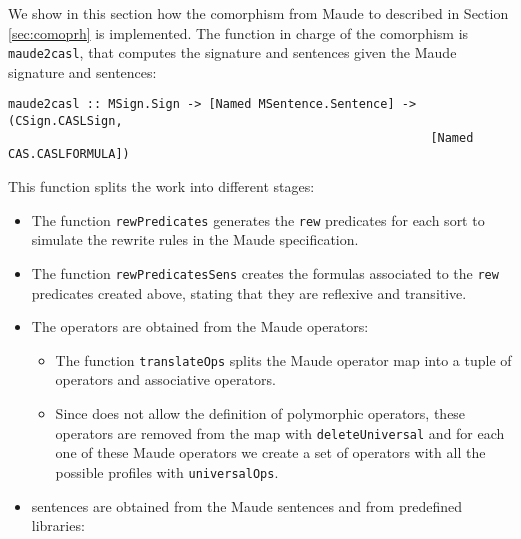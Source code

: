 
We show in this section how the comorphism
from Maude to \CASL described in Section \ref{sec:comoprh} is implemented.
The function in charge of the comorphism is
\verb"maude2casl", that computes the \CASL signature and sentences
given the Maude signature and sentences:

{\codesize
\begin{verbatim}
maude2casl :: MSign.Sign -> [Named MSentence.Sentence] -> (CSign.CASLSign, 
                                                           [Named CAS.CASLFORMULA])
\end{verbatim}
}

This function splits the work into different stages:

\begin{itemize}

\item
The function \verb"rewPredicates" generates the \verb"rew" predicates for
each sort to simulate the rewrite rules in the Maude specification.

\item
The function \verb"rewPredicatesSens" creates the formulas associated to
the \verb"rew" predicates created above, stating that they are reflexive
and transitive.

\item
The \CASL operators are obtained from the Maude operators:

\begin{itemize}
\item
The function \verb"translateOps" splits the Maude operator map
into a tuple of \CASL operators and \CASL associative operators.

\item
Since \CASL does not allow the definition
of polymorphic operators, these operators are removed from the map
with \verb"deleteUniversal" and for each one of these Maude operators we
create a set of \CASL operators with all the possible profiles with
\verb"universalOps".

\end{itemize}

\item \CASL sentences are obtained from the Maude sentences and from
predefined \CASL libraries:


\end{itemize}
